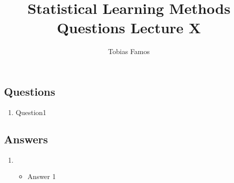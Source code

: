 \documentclass[11pt]{article}
\title{Statistical Learning Methods \\ Questions Lecture X}
\author{Tobias Famos}
\begin{document}
    \maketitle
    \subsection*{Questions}
    \begin{enumerate}
        \item Question1
    \end{enumerate}
    \newpage
    \subsection*{Answers}
    \begin{enumerate}
        \item \begin{itemize}
                  \item Answer 1
        \end{itemize}
    \end{enumerate}
\end{document}
